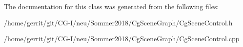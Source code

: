 The documentation for this class was generated from the following files\+:\begin{DoxyCompactItemize}
\item 
/home/gerrit/git/\+C\+G-\/\+I/neu/\+Sommer2018/\+Cg\+Scene\+Graph/Cg\+Scene\+Control.\+h\item 
/home/gerrit/git/\+C\+G-\/\+I/neu/\+Sommer2018/\+Cg\+Scene\+Graph/Cg\+Scene\+Control.\+cpp\end{DoxyCompactItemize}
